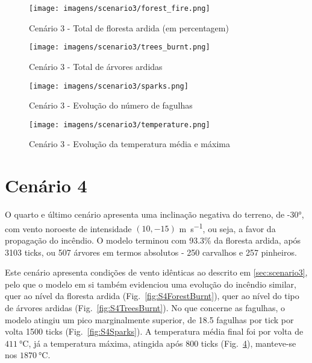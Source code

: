 \begin{figure}[H]
    \centering
    \texttt{[image: imagens/scenario3/forest\_fire.png]}
    \caption{Cenário 3 - Total de floresta ardida (em percentagem)}
    \label{fig:S3ForestBurnt}
\end{figure}

\begin{figure}[H]
    \centering
    \texttt{[image: imagens/scenario3/trees\_burnt.png]}
    \caption{Cenário 3 - Total de árvores ardidas}
    \label{fig:S3TreesBurnt}
\end{figure}

\begin{figure}[H]
    \centering
    \texttt{[image: imagens/scenario3/sparks.png]}
    \caption{Cenário 3 - Evolução do número de fagulhas}
    \label{fig:S3Sparks}
\end{figure}

\begin{figure}[H]
    \centering
    \texttt{[image: imagens/scenario3/temperature.png]}
    \caption{Cenário 3 - Evolução da temperatura média e máxima}
    \label{fig:S3Temp}
\end{figure}

\section{Cenário 4}\label{sec:scenario4}

O quarto e último cenário apresenta uma inclinação negativa do terreno, de \ang{-30}, com vento noroeste de intensidade $(10, -15)$ \si{\meter\per\second}, ou seja, a favor da propagação do incêndio. O modelo terminou com 93.3\% da floresta ardida, após 3103 ticks, ou 507 árvores em termos absolutos - 250 carvalhos e 257 pinheiros.

Este cenário apresenta condições de vento idênticas ao descrito em \ref{sec:scenario3}, pelo que o modelo em si também evidenciou uma evolução do incêndio similar, quer ao nível da floresta ardida (Fig.~\ref{fig:S4ForestBurnt}), quer ao nível do tipo de árvores ardidas (Fig.~\ref{fig:S4TreesBurnt}). No que concerne as fagulhas, o modelo atingiu um pico marginalmente superior, de 18.5 fagulhas por tick por volta 
1500 ticks (Fig.~\ref{fig:S4Sparks}). A temperatura média final foi por volta de $\SI{411}{\degreeCelsius}$, já a temperatura máxima, atingida após 800 ticks (Fig.~\ref{fig:S3Temp}), manteve-se nos $\SI{1870}{\degreeCelsius}$.

